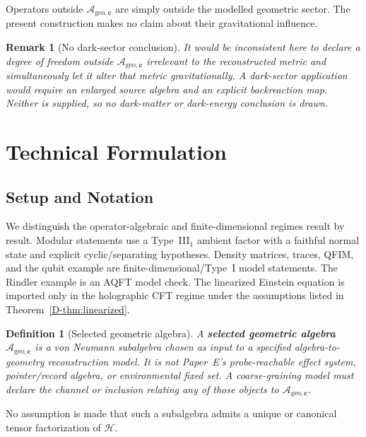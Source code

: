 \documentclass[12pt,a4paper,openany]{book}
\newtheorem{definition}[theorem]{Definition}
\newtheorem{remark}[theorem]{Remark}
\begin{document}
Operators outside $\mathcal{A}_{\mathrm{geo},\mathbf{c}}$ are simply outside the modelled geometric sector.  The present construction makes no claim about their gravitational influence.

\begin{remark}[No dark-sector conclusion]
It would be inconsistent here to declare a degree of freedom outside $\mathcal{A}_{\mathrm{geo},\mathbf{c}}$ irrelevant to the reconstructed metric and simultaneously let it alter that metric gravitationally.  A dark-sector application would require an enlarged source algebra and an explicit backreaction map.  Neither is supplied, so no dark-matter or dark-energy conclusion is drawn.
\end{remark}

\section{Technical Formulation}
\label{D-sec:technical}

\subsection{Setup and Notation}

We distinguish the operator-algebraic and finite-dimensional regimes result by result.  Modular statements use a Type~III$_1$ ambient factor with a faithful normal state and explicit cyclic/separating hypotheses.  Density matrices, traces, QFIM, and the qubit example are finite-dimensional/Type~I model statements.  The Rindler example is an AQFT model check.  The linearized Einstein equation is imported only in the holographic CFT regime under the assumptions listed in Theorem~\ref{D-thm:linearized}.

\begin{definition}[Selected geometric algebra]
\label{D-def:accessible}
A \textbf{selected geometric algebra} $\mathcal{A}_{\mathrm{geo},\mathbf{c}}$ is a von Neumann subalgebra chosen as input to a specified algebra-to-geometry reconstruction model.  It is not Paper~E's probe-reachable effect system, pointer/record algebra, or environmental fixed set.  A coarse-graining model must declare the channel or inclusion relating any of those objects to $\mathcal{A}_{\mathrm{geo},\mathbf{c}}$.
\end{definition}

No assumption is made that such a subalgebra admits a unique or canonical tensor factorization of $\mathcal{H}$.
\end{document}
